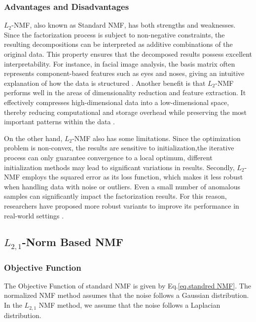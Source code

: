 \subsubsection{Advantages and Disadvantages}
$L_2$-NMF, also known as Standard NMF, has both strengths and weaknesses. Since the factorization process is subject to non-negative constraints, the resulting decompositions can be interpreted as additive combinations of the original data. This property ensures that the decomposed results possess excellent interpretability. For instance, in facial image analysis, the basis matrix often represents component-based features such as eyes and noses,  giving an intuitive explanation of how the data is structured \cite{lee1999learning}. Another benefit is that $L_2$-NMF performs well in the areas of dimensionality reduction and feature extraction. It effectively compresses high-dimensional data into a low-dimensional space, thereby reducing computational and storage overhead while preserving the most important patterns within the data \cite{buciu2008nmf}.

On the other hand, $L_2$-NMF also has some limitations. Since the optimization problem is non-convex, the results are sensitive to initialization,the iterative process can only guarantee convergence to a local optimum, different initialization methods may lead to significant variations in results. Secondly, $L_2$-NMF employs the squared error as its loss function, which makes it less robust when handling data with noise or outliers. Even a small number of anomalous samples can significantly impact the factorization results. For this reason, researchers have proposed more robust variants to improve its performance in real-world settings \cite{guan2012online}.


\subsection{$L_{2,1}$-Norm Based NMF}

\subsubsection{Objective Function}

The Objective Function of standard NMF is given by Eq.\eqref{eq.standred NMF}. The normalized NMF method assumes that the noise follows a Gaussian distribution. In the $L_{2,1}$ NMF method, we assume that the noise follows a Laplacian distribution\cite{kong2011robust}.

